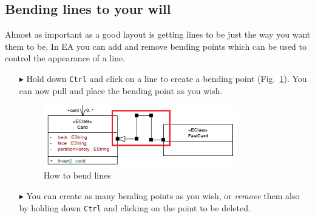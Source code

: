 \subsection{Bending lines to your will}

Almost as important as a good layout is getting lines to be just the way you want them to be. In EA you can add and remove bending points which can be used to
control the appearance of a line.

\begin{enumerate}
\item[$\blacktriangleright$]Hold down \texttt{Ctrl} and click on a line to create a bending point (Fig.~\ref{fig_bendLine01}). You can now pull and place the
bending point as you wish.
 
\begin{figure}[htbp]
\begin{center}
  \includegraphics[width=0.8\textwidth]{bendLine1}
  \caption{How to bend lines}   
  \label{fig_bendLine01}
\end{center}
\end{figure}

\item[$\blacktriangleright$] You can create as many bending points as you wish, or \emph{remove} them also by holding down \texttt{Ctrl} and clicking on the
point to be deleted.
\end{enumerate}
